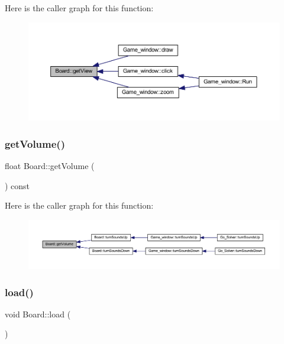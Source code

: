Here is the caller graph for this function\+:
\nopagebreak
\begin{figure}[H]
\begin{center}
\leavevmode
\includegraphics[width=350pt]{class_board_ad3c413e185668418d3a16c1fec68e70d_icgraph}
\end{center}
\end{figure}
\mbox{\label{class_board_a061962e73609a58802ad83674ec9b413}} 
\subsubsection{\texorpdfstring{get\+Volume()}{getVolume()}}
{\footnotesize\ttfamily float Board\+::get\+Volume (\begin{DoxyParamCaption}{ }\end{DoxyParamCaption}) const}

Here is the caller graph for this function\+:
\nopagebreak
\begin{figure}[H]
\begin{center}
\leavevmode
\includegraphics[width=350pt]{class_board_a061962e73609a58802ad83674ec9b413_icgraph}
\end{center}
\end{figure}
\mbox{\label{class_board_a841a248dac4743611ba1825afd5d1297}} 
\subsubsection{\texorpdfstring{load()}{load()}\hspace{0.1cm}{\footnotesize\ttfamily [1/2]}}
{\footnotesize\ttfamily void Board\+::load (\begin{DoxyParamCaption}{ }\end{DoxyParamCaption})}

